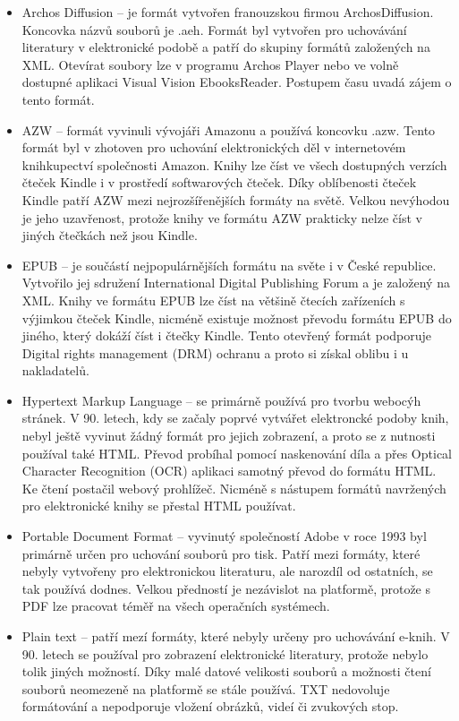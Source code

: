             \begin{itemize}
                \item Archos Diffusion – je formát vytvořen franouzskou firmou  ArchosDiffusion. Koncovka názvů souborů je .aeh. Formát byl vytvořen pro uchovávání literatury v elektronické podobě a patří do skupiny formátů založených na XML. Otevírat soubory lze v programu Archos Player nebo ve volně dostupné aplikaci Visual Vision EbooksReader. Postupem času uvadá zájem o tento formát.
                \item AZW – formát vyvinuli vývojáři Amazonu a používá koncovku .azw. Tento formát byl v zhotoven pro uchování elektronických děl v internetovém knihkupectví společnosti Amazon. Knihy lze číst ve všech dostupných verzích čteček Kindle i v prostředí softwarových čteček. Díky oblíbenosti čteček Kindle patří AZW mezi nejrozšířenějších formáty na světě. Velkou nevýhodou je jeho uzavřenost, protože knihy ve formátu AZW prakticky nelze číst v jiných čtečkách než jsou Kindle.
                \item EPUB – je součástí nejpopulárnějších formátu na světe i v České republice. Vytvořilo jej sdružení International Digital Publishing Forum a je založený na XML. Knihy ve formátu EPUB lze číst na většině čtecích zařízeních s výjimkou čteček Kindle, nicméně existuje možnost převodu formátu EPUB do jiného, který dokáží číst i čtečky Kindle. Tento otevřený formát podporuje Digital rights management (DRM) ochranu a proto si získal oblibu i u nakladatelů.
                \item Hypertext Markup Language – se primárně používá pro tvorbu webocýh stránek. V 90. letech, kdy se začaly poprvé vytvářet elektroncké podoby knih, nebyl ještě vyvinut žádný formát pro jejich zobrazení, a proto se z nutnosti používal také HTML. Převod probíhal pomocí naskenování díla a přes Optical Character Recognition (OCR) aplikaci samotný převod do formátu HTML. Ke čtení postačil webový prohlížeč. Nicméně s nástupem formátů navržených pro elektronické knihy se přestal HTML používat.
                \item Portable Document Format – vyvinutý společností Adobe v roce 1993 byl primárně určen pro uchování souborů pro tisk. Patří mezi formáty, které nebyly vytvořeny pro elektronickou literaturu, ale narozdíl od ostatních, se tak používá dodnes. Velkou předností je nezávislot na platformě, protože s PDF lze pracovat téměř na všech operačních systémech. 
                \item Plain text – patří mezí formáty, které nebyly určeny pro uchovávání e-knih. V 90. letech se používal pro zobrazení elektronické literatury, protože nebylo tolik jiných možností. Díky malé datové velikosti souborů a možnosti čtení souborů neomezeně na platformě se stále používá. TXT nedovoluje formátování a nepodporuje vložení obrázků, videí či zvukových stop.

\end{itemize}
